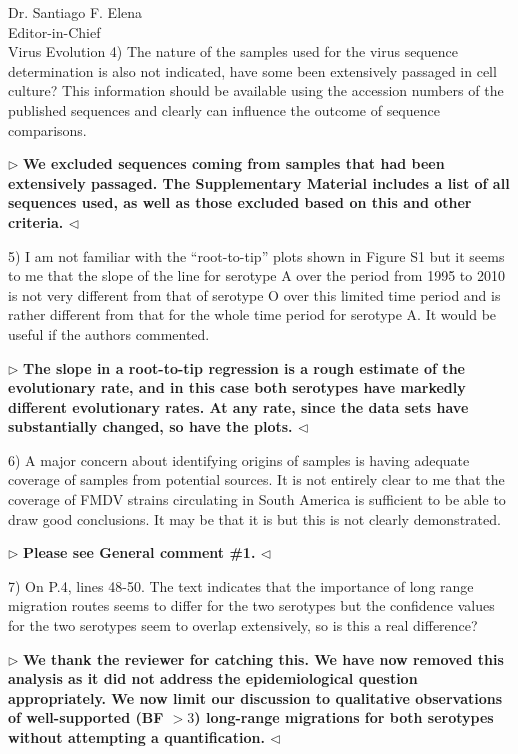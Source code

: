 \documentclass[ucla,biomath,12pt,noaddrfooter,datefrom]{UC_letter}
\newenvironment{reply}{$\triangleright$\bf}{$\triangleleft$}
\begin{document}
\begin{letter}{
Dr. Santiago F. Elena \\
Editor-in-Chief \\
Virus Evolution
}
4) The nature of the samples used for the virus sequence determination is also not indicated, have some been extensively passaged in cell culture? 
This information should be available using the accession numbers of the published sequences and clearly can influence the outcome of sequence comparisons.

\begin{reply}
We excluded sequences coming from samples that had been extensively passaged. 
The Supplementary Material includes a list of all sequences used, as well as those excluded based on this and other criteria. 
\end{reply}

5) I am not familiar with the ``root-to-tip'' plots shown in Figure S1 but it seems to me that the slope of the line for serotype A over the period from 1995 to 2010 is not very different from that of serotype O over this limited time period and is rather different from that for the whole time period for serotype A. 
It would be useful if the authors commented.

\begin{reply}
The slope in a root-to-tip regression is a rough estimate of the evolutionary rate, and in this case both serotypes have markedly different evolutionary rates.
At any rate, since the data sets have substantially changed, so have the plots.
\end{reply}

6)      A major concern about identifying origins of samples is having adequate coverage of samples from potential sources. 
It is not entirely clear to me that the coverage of FMDV strains circulating in South America is sufficient to be able to draw good conclusions. 
It may be that it is but this is not clearly demonstrated.

\begin{reply}
Please see General comment \#1.
\end{reply}

7)      On P.4, lines 48-50. The text indicates that the importance of long range migration routes seems to differ for the two serotypes but the confidence values for the two serotypes seem to overlap extensively, so is this a real difference?

\begin{reply}
We thank the reviewer for catching this.
We have now removed this analysis as it did not address the epidemiological question appropriately.
We now limit our discussion to qualitative observations of well-supported (BF $>3$) long-range migrations for both serotypes without attempting a quantification. 
\end{reply}


\end{letter}
\end{document}
